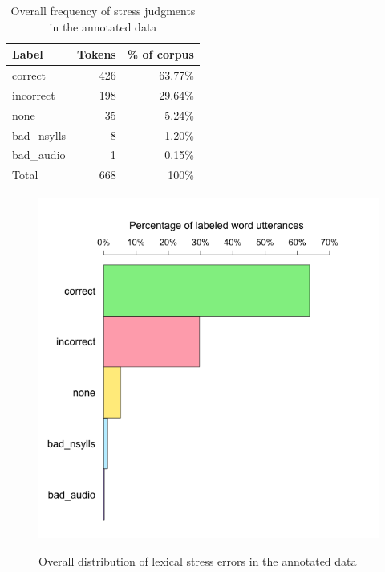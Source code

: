 		
		
		\begin{table}[htb]
			\centering
			\caption{Overall frequency of stress judgments in the annotated data}
			\begin{tabular}{lrr}
			\toprule
			Label & Tokens & \% of corpus \\
			\midrule
			correct	& 426	& 63.77\% \\
			incorrect &	198	& 29.64\% \\
			none	 &35 &	5.24\% \\
			bad\_nsylls	& 8	& 1.20\% \\
			bad\_audio	& 1	& 0.15\%\\
			\midrule
			Total & 668 & 100\%\\
			\bottomrule
			\end{tabular}
			\label{tab:results:overall}
		\end{table}
		
		
		\begin{figure}[ht]
			\centering
			\caption{Overall distribution of lexical stress errors in the annotated data}
			\includegraphics[width=.7\textwidth]{img/plots/overallJudgments-axisTop-noLabels}
			\label{fig:results:overallbars}
		\end{figure}
		
